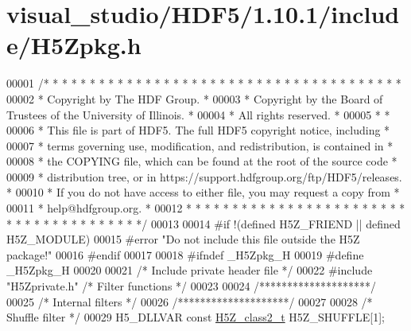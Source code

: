 \hypertarget{visual__studio_2_h_d_f5_21_810_81_2include_2_h5_zpkg_8h_source}{}\section{visual\+\_\+studio/\+H\+D\+F5/1.10.1/include/\+H5\+Zpkg.h}
\label{visual__studio_2_h_d_f5_21_810_81_2include_2_h5_zpkg_8h_source}

\begin{DoxyCode}
00001 \textcolor{comment}{/* * * * * * * * * * * * * * * * * * * * * * * * * * * * * * * * * * * * * * *}
00002 \textcolor{comment}{ * Copyright by The HDF Group.                                               *}
00003 \textcolor{comment}{ * Copyright by the Board of Trustees of the University of Illinois.         *}
00004 \textcolor{comment}{ * All rights reserved.                                                      *}
00005 \textcolor{comment}{ *                                                                           *}
00006 \textcolor{comment}{ * This file is part of HDF5.  The full HDF5 copyright notice, including     *}
00007 \textcolor{comment}{ * terms governing use, modification, and redistribution, is contained in    *}
00008 \textcolor{comment}{ * the COPYING file, which can be found at the root of the source code       *}
00009 \textcolor{comment}{ * distribution tree, or in https://support.hdfgroup.org/ftp/HDF5/releases.  *}
00010 \textcolor{comment}{ * If you do not have access to either file, you may request a copy from     *}
00011 \textcolor{comment}{ * help@hdfgroup.org.                                                        *}
00012 \textcolor{comment}{ * * * * * * * * * * * * * * * * * * * * * * * * * * * * * * * * * * * * * * */}
00013 
00014 \textcolor{preprocessor}{#if !(defined H5Z\_FRIEND || defined H5Z\_MODULE)}
00015 \textcolor{preprocessor}{#error "Do not include this file outside the H5Z package!"}
00016 \textcolor{preprocessor}{#endif}
00017 
00018 \textcolor{preprocessor}{#ifndef \_H5Zpkg\_H}
00019 \textcolor{preprocessor}{#define \_H5Zpkg\_H}
00020 
00021 \textcolor{comment}{/* Include private header file */}
00022 \textcolor{preprocessor}{#include "H5Zprivate.h"}          \textcolor{comment}{/* Filter functions                */}
00023 
00024 \textcolor{comment}{/********************/}
00025 \textcolor{comment}{/* Internal filters */}
00026 \textcolor{comment}{/********************/}
00027 
00028 \textcolor{comment}{/* Shuffle filter */}
00029 H5\_DLLVAR \textcolor{keyword}{const} \hyperlink{struct_h5_z__class2__t}{H5Z\_class2\_t} H5Z\_SHUFFLE[1];

\end{DoxyCode}
